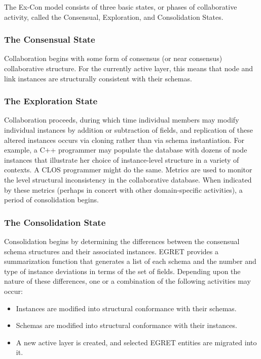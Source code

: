 The Ex-Con model consists of three basic states, or phases of collaborative activity, called the Consensual, Exploration, and Consolidation States.

\subsubsection{The Consensual State}
  
Collaboration begins with some form of consensus (or near consensus) collaborative structure. For the currently active layer, this means that node and link instances are structurally consistent with their schemas.

\subsubsection{The Exploration State}

Collaboration proceeds, during which time individual members may modify individual instances by addition or subtraction of fields, and replication of these altered instances occurs via cloning rather than via schema instantiation.  For example, a C++ programmer may populate the database with dozens of node instances that illustrate her choice of instance-level structure in a variety of contexts.  A CLOS programmer might do the same. Metrics are used to monitor the level structural inconsistency in the collaborative database. When indicated by these metrics (perhaps in concert with other domain-specific activities), a period of consolidation begins.

\subsubsection{The Consolidation State} 

Consolidation begins by determining the differences between the consensual schema structures and their associated instances. EGRET provides a summarization function that generates a list of each schema and the number and type of instance deviations in terms of the set of fields.  Depending upon the nature of these differences, one or a combination of the following activities may occur:

\begin{itemize}
\item Instances are modified into structural conformance with their schemas.
  
\item Schemas are modified into structural conformance with their instances.
  
\item A new active layer is created, and selected EGRET entities are migrated into it.
\end{itemize}

